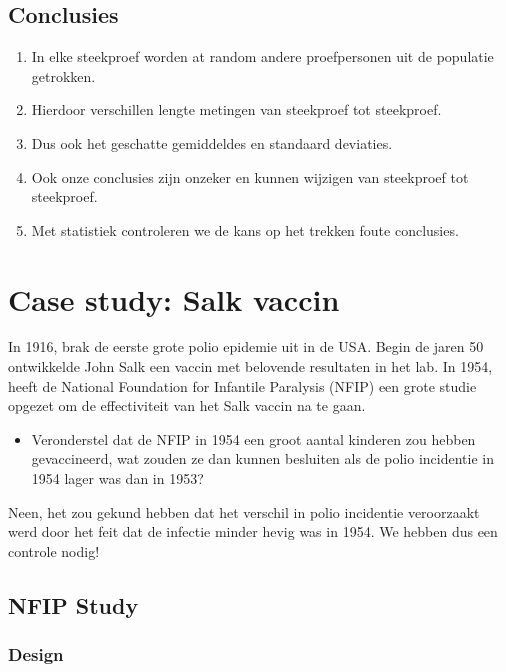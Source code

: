\documentclass[
  12pt,dutch,coursenotes]{book}
\providecommand{\tightlist}{%
  \setlength{\itemsep}{0pt}\setlength{\parskip}{0pt}}
\begin{document}
\hypertarget{conclusies}{%
\subsection{Conclusies}\label{conclusies}}

\begin{enumerate}
\def\labelenumi{\arabic{enumi}.}
\item
  In elke steekproef worden at random andere proefpersonen uit de populatie getrokken.
\item
  Hierdoor verschillen lengte metingen van steekproef tot steekproef.
\item
  Dus ook het geschatte gemiddeldes en standaard deviaties.
\item
  Ook onze conclusies zijn onzeker en kunnen wijzigen van steekproef tot steekproef.
\item
  Met statistiek controleren we de kans op het trekken foute conclusies.
\end{enumerate}

\hypertarget{case-study-salk-vaccin}{%
\section{Case study: Salk vaccin}\label{case-study-salk-vaccin}}

In 1916, brak de eerste grote polio epidemie uit in de USA.
Begin de jaren 50 ontwikkelde John Salk een vaccin met belovende resultaten in het lab.
In 1954, heeft de National Foundation for Infantile Paralysis (NFIP) een grote studie opgezet om de effectiviteit van het Salk vaccin na te gaan.

\begin{itemize}
\tightlist
\item
  Veronderstel dat de NFIP in 1954 een groot aantal kinderen zou hebben gevaccineerd, wat zouden ze dan kunnen besluiten als de polio incidentie in 1954 lager was dan in 1953?
\end{itemize}

Neen, het zou gekund hebben dat het verschil in polio incidentie veroorzaakt werd door het feit dat de infectie minder hevig was in 1954.
We hebben dus een controle nodig!

\hypertarget{nfip-study}{%
\subsection{NFIP Study}\label{nfip-study}}

\hypertarget{design}{%
\subsubsection{Design}\label{design}}
\end{document}
